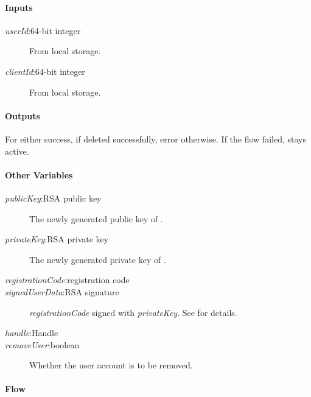 \documentclass[a4paper,10pt,draft]{article}
\newcommand{\signedUserData}{\emph{signedUserData}}
\newcommand{\handle}{\emph{handle}}
\newcommand{\registrationCode}{\emph{registrationCode}}
\newcommand{\privateKey}{\emph{privateKey}}
\newcommand{\publicKey}{\emph{publicKey}}
\newcommand{\userId}{\emph{userId}}
\newcommand{\clientId}{\emph{clientId}}
\newcommand{\removeUser}{\emph{removeUser}}
\begin{document}
\paragraph{Inputs}
\SpecialItem
\begin{description}
 \item[\userId{}:64-bit integer] From \Client{} local storage.
 \item[\clientId{}:64-bit integer] From \Client{} local storage.
\end{description}

\paragraph{Outputs}
For \Client{} either success, if \Server{} deleted \Client{} successfully, 
error otherwise. If the flow failed, \Client{} stays active.

\paragraph{Other Variables}
\SpecialItem
\begin{description}
 \item[\publicKey{}:RSA public key] The newly generated public key of 
\Client{}. 
 \item[\privateKey{}:RSA private key] The newly generated private key of
\Client{}.
 \item[\registrationCode{}:registration code]
 \item[\signedUserData{}:RSA signature] \registrationCode{} signed with
\privateKey{}. See \cite{crypto_spec} for details.
 \item[\handle{}:Handle]
 \item[\removeUser:boolean] Whether the user account is to be removed.
\end{description}

\paragraph{Flow}
\end{document}
